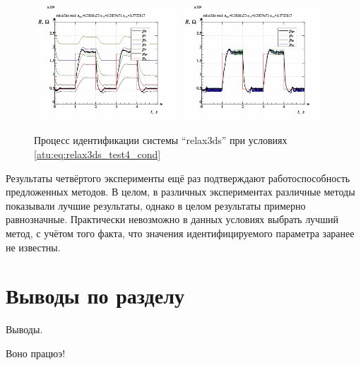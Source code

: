 \begin{figure}[htb!]
  \centerline{
    \includegraphics[width=0.48\textwidth]{p/relax3ds_read_id2_3-p_p.png}
    \hfill
    \includegraphics[width=0.48\textwidth]{p/relax3ds_read_id2_3-p_pp.png}
  }
  \caption{Процесс идентификации системы ``relax3ds'' при условиях \ref{atu:eq:relax3ds_test4_cond}}
  \label{atu:f:relax3ds_id_3}
\end{figure}

Результаты четвёртого эксперименты ещё раз
подтверждают работоспособность предложенных методов.
В целом, в различных экспериментах различные методы
показывали лучшие результаты, однако в целом результаты
примерно равнозначные. Практически невозможно в данных условиях выбрать лучший
метод, с учётом того факта, что значения идентифицируемого
параметра заранее не известны.




\section{Выводы по разделу \thechapter}

Выводы.

Воно працюэ!


